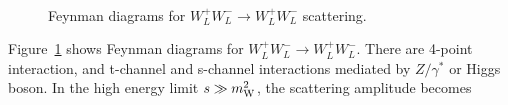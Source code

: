\begin{figure}[t]
\centering
{}
\hspace{0.5cm}
\hspace{0.5cm}
\\
\vspace{0.5cm}
\hspace{0.5cm}
\caption{Feynman diagrams for $W_L^+W_L^- \to W_L^+W_L^-$ scattering.} 
\label{fig:FD_unitary}
\end{figure}
Figure~\ref{fig:FD_unitary} shows Feynman diagrams for $W_L^+W_L^- \to W_L^+W_L^-$. 
There are 4-point interaction, and t-channel and s-channel interactions mediated 
by $Z/\gamma^*$ or Higgs boson.
In the high energy limit $s \gg m_{\mathrm{W}}^2$, the scattering amplitude becomes \cite{Djouadi20081} 
